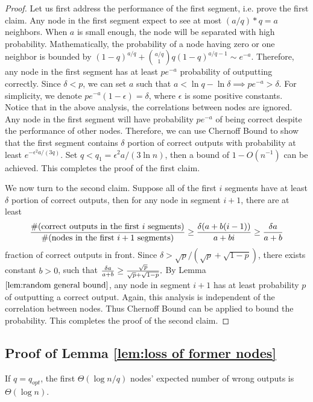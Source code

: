 \documentclass[a4paper,UKenglish]{lipics}
\theoremstyle{definition}
\begin{document}
\begin{proof}
Let us first address the performance of the first segment, i.e. prove the first claim.
Any node in the first segment expect to see at most $(a/q)*q = a$ neighbors.
When $a$ is small enough, the node will be separated with high probability.
Mathematically, the probability of a node having zero or one neighbor is bounded by
$
	(1-q)^{a/q} + {a/q \choose 1}q(1-q)^{a/q - 1} 
\sim
	e^{-a}.
$
Therefore, any node in the first segment has at least $pe^{-a}$ probability of outputting correctly.
Since $\delta < p$, we can set $a$ such that
$
	a < \ln q - \ln \delta 
	\implies 
	pe^{-a} > \delta.
$
For simplicity, we denote $pe^{-a}(1-\epsilon) = \delta$, where $\epsilon$ is some positive constants.
Notice that in the above analysis, the correlations between nodes are ignored.
Any node in the first segment will have probability $pe^{-a}$ of being correct despite the performance of other nodes.
Therefore, we can use Chernoff Bound to show that the first segment 
	contains $\delta$ portion of correct outputs with probability at least $e^{-\epsilon^2a/(3q)}$.
Set $q < q_1 = \epsilon^2a / (3\ln n)$, then a bound of $1 - O(n^{-1})$ can be achieved. 
This completes the proof of the first claim.

We now turn to the second claim.
Suppose all of the first $i$ segments have at least $\delta$ portion of correct outputs,
	then for any node in segment $i+1$, there are at least 
\begin{equation*}
	{\#(\text{correct outputs in the first $i$ segments}) \over \#(\text{nodes in the first $i+1$ segments})}
\ge
	{\delta(a + b(i-1)) \over a + bi } 
\ge 
	{\delta a\over a + b}
\end{equation*}
fraction of correct outputs in front.
Since $\delta > \sqrt{p}/(\sqrt{p}+\sqrt{1-p})$, there exists constant $b > 0$, such that
$
	{\delta a\over a + b} 
\ge 
	{\sqrt{p}\over \sqrt{p}+\sqrt{1-p}}.
$
By Lemma $\ref{lem:random general bound}$, any node in segment $i+1$ has at least probability $p$ of outputting a correct output.
Again, this analysis is independent of the correlation between nodes.
Thus Chernoff Bound can be applied to bound the probability.
This completes the proof of the second claim.
\end{proof}



\subsection{Proof of Lemma \ref{lem:loss of former nodes}}
\label{subsec:loss of former nodes}
If $q = q_{opt}$, the first $\Theta(\log n/q)$ nodes' expected number of wrong outputs is $\Theta(\log n)$.
\end{document}
